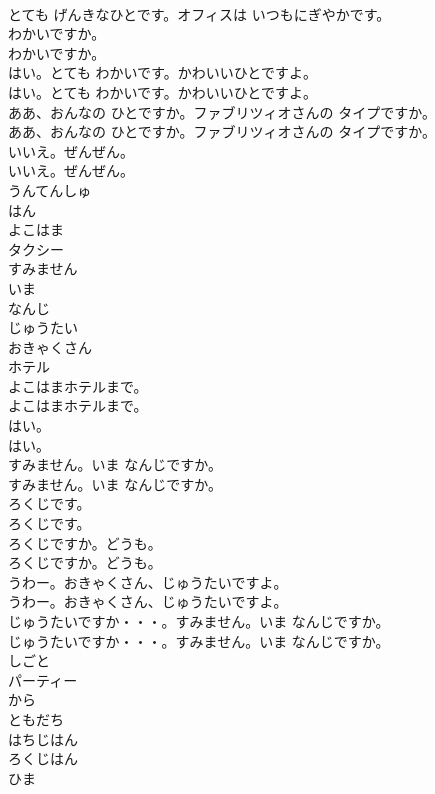 \documentclass[8pt]{extreport}
\begin{document}
\begin{CJK}{UTF8}{min}
\\	とても げんきなひとです。オフィスは いつもにぎやかです。 
\\	わかいですか。	
\\	わかいですか。 
\\	はい。とても わかいです。かわいいひとですよ。	
\\	はい。とても わかいです。かわいいひとですよ。 
\\	ああ、おんなの ひとですか。ファブリツィオさんの タイプですか。	
\\	ああ、おんなの ひとですか。ファブリツィオさんの タイプですか。 
\\	いいえ。ぜんぜん。	
\\	いいえ。ぜんぜん。 
\\	うんてんしゅ
\\	はん
\\	よこはま
\\	タクシー
\\	すみません
\\	いま
\\	なんじ
\\	じゅうたい
\\	おきゃくさん
\\	ホテル
\\	よこはまホテルまで。	
\\	よこはまホテルまで。 
\\	はい。	
\\	はい。 
\\	すみません。いま なんじですか。	
\\	すみません。いま なんじですか。 
\\	ろくじです。	
\\	ろくじです。 
\\	ろくじですか。どうも。	
\\	ろくじですか。どうも。 
\\	うわー。おきゃくさん、じゅうたいですよ。	
\\	うわー。おきゃくさん、じゅうたいですよ。 
\\	じゅうたいですか・・・。すみません。いま なんじですか。	
\\	じゅうたいですか・・・。すみません。いま なんじですか。 
\\	しごと
\\	パーティー
\\	から
\\	ともだち
\\	はちじはん
\\	ろくじはん
\\	ひま

\end{CJK}
\end{document}
